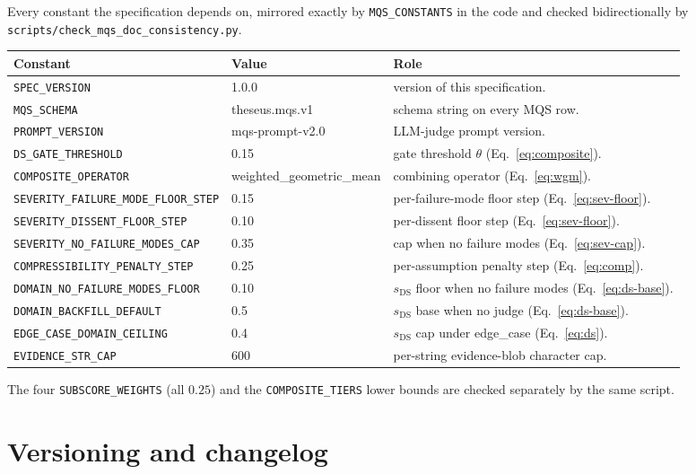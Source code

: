 \documentclass[11pt]{article}
\newcommand{\sDS}{s_{\mathrm{DS}}}
\newcommand{\code}[1]{\texttt{#1}}
\begin{document}
Every constant the specification depends on, mirrored exactly by
\code{MQS\_CONSTANTS} in the code and checked bidirectionally by
\code{scripts/check\_mqs\_doc\_consistency.py}.
\begin{center}
\begin{longtable}{lll}
\toprule
Constant & Value & Role\\
\midrule
\endhead
\texttt{SPEC\_VERSION} & 1.0.0 & version of this specification.\\
\texttt{MQS\_SCHEMA} & theseus.mqs.v1 & schema string on every MQS row.\\
\texttt{PROMPT\_VERSION} & mqs-prompt-v2.0 & LLM-judge prompt version.\\
\texttt{DS\_GATE\_THRESHOLD} & 0.15 & gate threshold $\theta$ (Eq.~\eqref{eq:composite}).\\
\texttt{COMPOSITE\_OPERATOR} & weighted\_geometric\_mean & combining operator (Eq.~\eqref{eq:wgm}).\\
\texttt{SEVERITY\_FAILURE\_MODE\_FLOOR\_STEP} & 0.15 & per-failure-mode floor step (Eq.~\eqref{eq:sev-floor}).\\
\texttt{SEVERITY\_DISSENT\_FLOOR\_STEP} & 0.10 & per-dissent floor step (Eq.~\eqref{eq:sev-floor}).\\
\texttt{SEVERITY\_NO\_FAILURE\_MODES\_CAP} & 0.35 & cap when no failure modes (Eq.~\eqref{eq:sev-cap}).\\
\texttt{COMPRESSIBILITY\_PENALTY\_STEP} & 0.25 & per-assumption penalty step (Eq.~\eqref{eq:comp}).\\
\texttt{DOMAIN\_NO\_FAILURE\_MODES\_FLOOR} & 0.10 & $\sDS$ floor when no failure modes (Eq.~\eqref{eq:ds-base}).\\
\texttt{DOMAIN\_BACKFILL\_DEFAULT} & 0.5 & $\sDS$ base when no judge (Eq.~\eqref{eq:ds-base}).\\
\texttt{EDGE\_CASE\_DOMAIN\_CEILING} & 0.4 & $\sDS$ cap under \textsf{edge\_case} (Eq.~\eqref{eq:ds}).\\
\texttt{EVIDENCE\_STR\_CAP} & 600 & per-string evidence-blob character cap.\\
\bottomrule
\end{longtable}
\end{center}
The four \code{SUBSCORE\_WEIGHTS} (all $0.25$) and the \code{COMPOSITE\_TIERS}
lower bounds are checked separately by the same script.

\section{Versioning and changelog}
\end{document}
